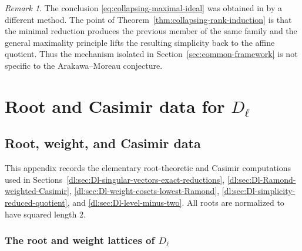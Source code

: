 \documentclass[11pt,reqno]{amsart}
\theoremstyle{definition}
\theoremstyle{remark}
\newtheorem{remark}[theorem]{Remark}
\begin{document}
\begin{remark}
The conclusion \eqref{eq:collapsing-maximal-ideal} was obtained in
\cite{AdamovicKacMosenederFrajriaPapiPerse2020} by a different method.
The point of Theorem~\ref{thm:collapsing-rank-induction} is that the
minimal reduction produces the previous member of the same family and the
general maximality principle lifts the resulting simplicity back to the
affine quotient.  Thus the mechanism isolated in Section~\ref{sec:common-framework}
is not specific to the Arakawa--Moreau conjecture.
\end{remark}
\appendix
\section{Root and Casimir data for \texorpdfstring{$D_\ell$}{D-l}}


\subsection{Root, weight, and Casimir data}
\label{dl:app:Dl-root-weight-Casimir-data}

This appendix records the elementary root-theoretic and Casimir
computations used in
Sections~\ref{dl:sec:Dl-singular-vectors-exact-reductions},
\ref{dl:sec:Dl-Ramond-weighted-Casimir},
\ref{dl:sec:Dl-weight-cosets-lowest-Ramond},
\ref{dl:sec:Dl-simplicity-reduced-quotient}, and
\ref{dl:sec:Dl-level-minus-two}.  All roots are normalized to have
squared length \(2\).

\subsubsection{The root and weight lattices of \(D_\ell\)}
\end{document}
